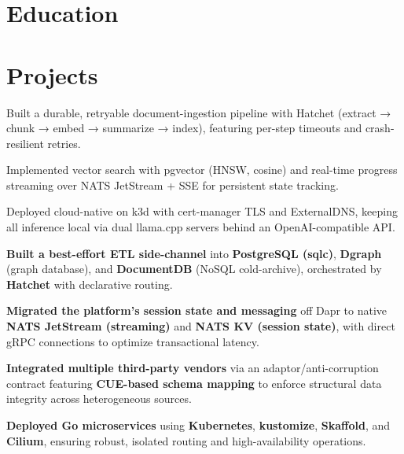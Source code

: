 \documentclass[10pt,a4paper]{resume}
\begin{document}
\section{Education}

\vspace{2pt}

\section{Projects}

\bullets
  \item Built a durable, retryable document-ingestion pipeline with Hatchet (extract → chunk → embed → summarize → index), featuring per-step timeouts and crash-resilient retries.
  \item Implemented vector search with pgvector (HNSW, cosine) and real-time progress streaming over NATS JetStream + SSE for persistent state tracking.
  \item Deployed cloud-native on k3d with cert-manager TLS and ExternalDNS, keeping all inference local via dual llama.cpp servers behind an OpenAI-compatible API.
\bulletsend
\vspace{1.0pt}
\bullets
  \item \textbf{Built a best-effort ETL side-channel} into \textbf{PostgreSQL (sqlc)}, \textbf{Dgraph} (graph database), and \textbf{DocumentDB} (NoSQL cold-archive), orchestrated by \textbf{Hatchet} with declarative routing.
  \item \textbf{Migrated the platform's session state and messaging} off Dapr to native \textbf{NATS JetStream (streaming)} and \textbf{NATS KV (session state)}, with direct gRPC connections to optimize transactional latency.
  \item \textbf{Integrated multiple third-party vendors} via an adaptor/anti-corruption contract featuring \textbf{CUE-based schema mapping} to enforce structural data integrity across heterogeneous sources.
  \item \textbf{Deployed Go microservices} using \textbf{Kubernetes}, \textbf{kustomize}, \textbf{Skaffold}, and \textbf{Cilium}, ensuring robust, isolated routing and high-availability operations.
\bulletsend
\end{document}
